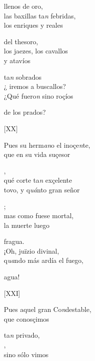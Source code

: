 \documentclass[11pt,a4paper,twoside]{article}
\begin{document}
{llenos de oro,\\
las baxillas ta\textit{n} febridas,\\
los enriques y reales

del thesoro,\\
los jaezes, los cavallos\\
 y atavíos

ta\textit{n} sobrados\\
¿ iremos a buscallos?\\
¿Qué fuero\textit{n} sino roçíos

de los prados?
\pend

\begin{center}
	[XX]
\end{center}
\pstart
Pues su herm\textit{an}o el inoçe\textit{n}te,\\
que en su vida suçesor

,\\
qué corte ta\textit{n} exçelente\\
tovo, y q\textit{uá}nto gran señor

 ;\\
mas como fuese mortal,\\
 la muerte luego

 fragua.\\
¡Oh, juïzio divinal,\\
q\textit{ua}ndo más ardía el fuego,

 agua!
\pend

\begin{center}
	[XXI]
\end{center}
\pstart
Pues aquel gran Co\textit{n}destable,\\
 que conosçimos

ta\textit{n} privado,\\
 ,\\
sino sólo  vimos

}
\end{document}
